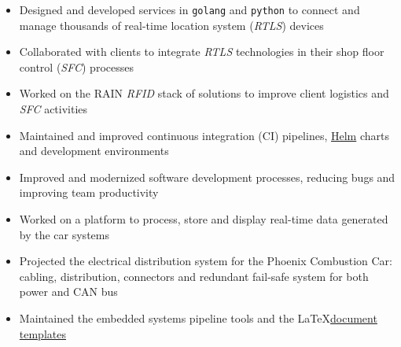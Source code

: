 \documentclass[9pt,a4paper,ragged2e,withhyper]{altacv}
\begin{document}
\begin{paracol}{2}


\begin{itemize}
  \item Designed and developed services in \texttt{golang} and \texttt{python} to connect and manage thousands of real-time location system (\textit{RTLS}) devices 
  \item Collaborated with clients to integrate \textit{RTLS} technologies in their shop floor control (\textit{SFC}) processes
  \item Worked on the RAIN \textit{RFID} stack of solutions to improve client logistics and \textit{SFC} activities
  \item Maintained and improved continuous integration (CI) pipelines, \href{https://helm.sh/}{Helm} charts and development environments
  \item Improved and modernized software development processes, reducing bugs and improving team productivity
\end{itemize}


\begin{itemize}
  \item Worked on a platform to process, store and display real-time data generated by the car systems
  \item Projected the electrical distribution system for the Phoenix Combustion Car: cabling, distribution, connectors and redundant fail-safe system for both power and CAN bus
  \item Maintained the embedded systems pipeline tools and the \LaTeX \linebreak \href{https://github.com/engeniusua/engenius-ua-latex-template}{document templates}
\end{itemize}




\end{paracol}
\end{document}
